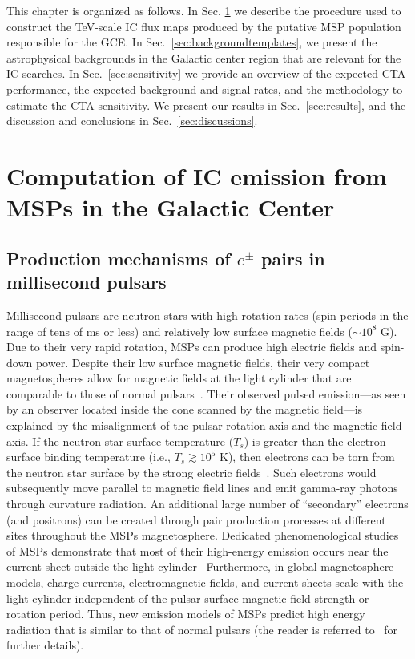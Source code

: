 \documentclass[doublespace,nopageskip]{VTthesis} %
\begin{document}
This chapter is organized as follows. In Sec. \ref{sec:ICfromMSPs} we describe the procedure used to construct the TeV-scale IC flux maps produced by the putative MSP population responsible for the GCE. In Sec.~\ref{sec:backgroundtemplates}, we present the astrophysical backgrounds in the Galactic center region that are relevant for the IC searches. In Sec.~\ref{sec:sensitivity} we provide an overview of the expected CTA performance, the expected background and signal rates, and the methodology to estimate the CTA sensitivity. We present our results in Sec.~\ref{sec:results}, and the discussion and conclusions in Sec.~\ref{sec:discussions}. 
 
 

\section{Computation of IC emission from MSPs in the Galactic Center}
\label{sec:ICfromMSPs}


\subsection{Production mechanisms of $e^{\pm}$ pairs in millisecond pulsars}
\label{subsec:e+-injection}

Millisecond pulsars are neutron stars with high rotation rates (spin periods in the range of tens of ms or less) and relatively low surface magnetic fields ($\sim 10^{8}$ G). Due to their very rapid rotation, MSPs can produce high  
electric fields and spin-down power. Despite their low surface magnetic fields, their very compact magnetospheres allow for 
magnetic fields at the light cylinder that are comparable to those of normal pulsars~\citep{Harding:2021yuv}. Their observed pulsed emission---as seen by an observer located inside the cone scanned by the magnetic field---is explained by the misalignment of the pulsar rotation axis and the magnetic field axis.  If the neutron star surface temperature ($T_s$) is greater than the electron surface binding temperature (i.e., $T_s\gtrsim 10^5$ K), then electrons can be torn from the neutron star surface by the strong electric fields~\citep{Michel:1991}. Such electrons would subsequently move parallel to magnetic field lines and emit gamma-ray photons through curvature radiation. An additional large number of ``secondary'' electrons (and positrons) can be created through pair production processes at different sites throughout the MSPs magnetosphere. 
Dedicated phenomenological studies of MSPs demonstrate that most of their high-energy emission occurs near the current sheet outside the light cylinder~\citep{Fermi-LAT:4FGL,Harding:2021yuv}
Furthermore, in global magnetosphere models, charge currents, electromagnetic fields, and current sheets scale with the light cylinder independent of the pulsar surface magnetic field strength or rotation period. Thus, new emission models of MSPs predict high energy radiation that is similar to that of normal pulsars (the reader is referred to~\citealt{Harding:2021yuv} for further details).
\end{document}
